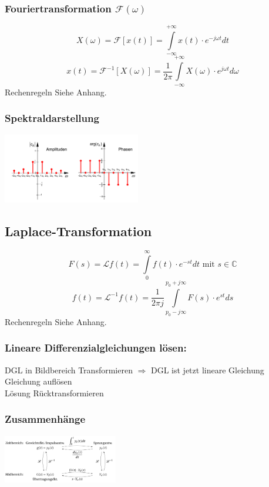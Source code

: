 \begin{multicols}{2}

  \subsubsection*{Fouriertransformation $\mathcal{F}(\omega)$}
  $$ X(\omega) = \mathcal{F}[x(t)] = \int \limits _{-\infty} ^{+\infty} x(t) \cdot e^{-j \omega t} dt $$
  $$ x(t) = \mathcal{F}^{-1}[X(\omega)] = \frac{1}{2 \pi} \int \limits _{- \infty} ^{+ \infty} X(\omega) \cdot e^{j \omega t} d\omega$$
  Rechenregeln Siehe Anhang.


  \subsubsection*{Spektraldarstellung}
  \includegraphics[width = 6cm]{include/Integraltransformationen/img/Spektrum.png}
\end{multicols}

\subsection{Laplace-Transformation}
\begin{multicols}{2}
  
  $$F(s) = \mathscr{L} {f(t)} = \int \limits _{0} ^{\infty} f(t) \cdot e^{-st} dt \textrm{ mit } s \in \mathbb{C}$$
  $$f(t) = \mathscr{L}^{-1} {f(t)} = \frac{1}{2\pi j} \int \limits _{p_0-j\infty} ^{p_0 + j\infty} F(s) \cdot e^{st} ds$$
  Rechenregeln Siehe Anhang.
  \subsubsection*{Lineare Differenzialgleichungen lösen:}
  DGL in Bildbereich Transformieren $\Rightarrow$ DGL ist jetzt lineare Gleichung
  \\Gleichung auflösen
  \\Lösung Rücktransformieren
  
  \subsubsection*{Zusammenhänge}
  \includegraphics[width = 5cm]{include/Integraltransformationen/img/Zusammenhang_Laplace.png}
\end{multicols}

